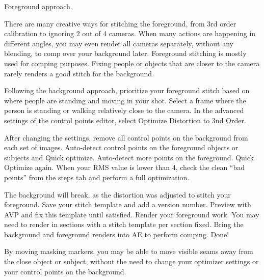 \begin{fullwidth}

{\large Foreground approach. \par}

There are many creative ways for stitching the foreground, from 3rd order calibration to ignoring 2 out of 4 cameras. When many actions are happening in different angles, you may even render all cameras separately, without any blending, to comp over your background later. Foreground stitching is mostly used for comping purposes. Fixing people or objects that are closer to the camera rarely renders a good stitch for the background.

\clearpage

Following the background approach, prioritize your foreground stitch based on where people are standing and moving in your shot. Select a frame where the person is standing or walking relatively close to the camera. In the advanced settings of the control points editor, select Optimize Distortion to 3nd Order.


After changing the settings, remove all control points on the background from each set of images. Auto-detect control points on the foreground objects or subjects and Quick optimize. Auto-detect more points on the foreground. Quick Optimize again. When your RMS value is lower than 4, check the clean “bad points” from the steps tab and perform a full optimization.


\clearpage

The background will break, as the distortion was adjusted to stitch your foreground. Save your stitch template and add a version number. Preview with AVP and fix this template until satisfied. Render your foreground work. You may need to render in sections with a stitch template per section fixed. Bring the background and foreground renders into AE to perform comping. Done!


\tip By moving masking markers, you may be able to move visible seams away from the close object or subject, without the need to change your optimizer settings or your control points on the background.


\clearpage
\end{fullwidth}